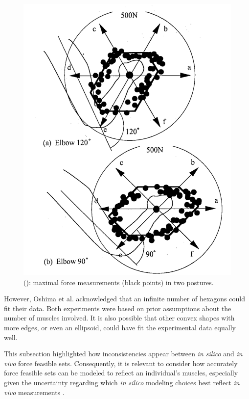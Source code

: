 \begin{figure}[!htb]
\begin{minipage}{0.48\linewidth}
        \includegraphics[trim={0 0 0 0},clip,width=0.8\linewidth]{img/chapter_1/oshima_force_output.png}
        \caption{(\cite{oshimaRoboticAnalysesOutput2000}):  maximal force measurements (black points) in two postures.}
        \label{fig:oshima_force_hexagon}
    \end{minipage}
\end{figure}

However, Oshima et al. acknowledged that an infinite number of hexagons could fit their data. Both experiments were based on prior assumptions about the number of muscles involved. It is also possible that other convex shapes with more edges, or even an ellipsoid, could have fit the experimental data equally well.



This subsection highlighted how inconsistencies appear between \emph{in silico} and \emph{in vivo} force feasible sets. Consequently, it is relevant to consider how accurately force feasible sets can be modeled to reflect an individual's muscles, especially given the uncertainty regarding which \emph{in silico} modeling choices best reflect \emph{in vivo} measurements \cite{sutjiptoComparisonStrengthProfile2024a}.

